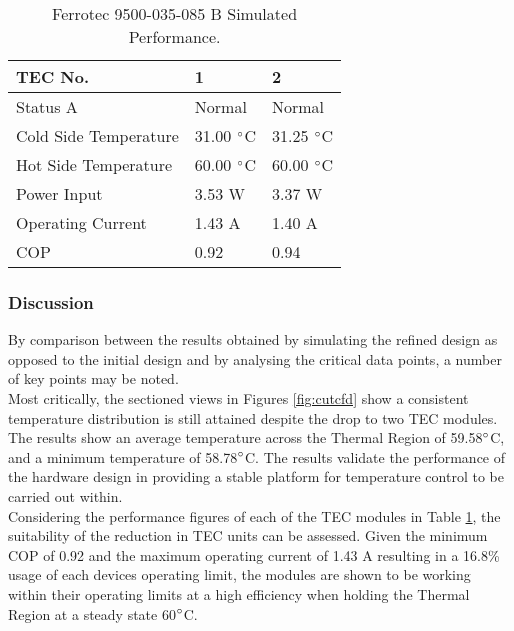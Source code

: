 \begin{table}[h!]
	\begin{center}
		\begin{tabular}{ p{5.15cm} |  p{3.15cm} | p{3.15cm} }
			\hline
			TEC No. & 1 & 2 \\ \hline
			Status A & Normal & Normal \\ \hline
			Cold Side Temperature & 31.00 $\degree$C & 31.25 $\degree$C \\ \hline
			Hot Side Temperature & 60.00 $\degree$C & 60.00 $\degree$C \\ \hline
			Power Input & 3.53 W & 3.37 W \\ \hline
			Operating Current & 1.43 A & 1.40 A \\ \hline
			COP & 0.92 & 0.94 \\ \hline
		\end{tabular}
	\end{center}
	\caption[Ferrotec 9500-035-085 B Simulated Performance.]{Ferrotec 9500-035-085 B Simulated Performance.}
	\label{tab:TECperf2}
\end{table}

\subsubsection{Discussion}

By comparison between the results obtained by simulating the refined design as opposed to the initial design and by analysing the critical data points, a number of key points may be noted.\\

Most critically, the sectioned views in Figures \ref{fig:cutcfd} show a consistent temperature distribution is still attained despite the drop to two TEC modules. The results show an average temperature across the Thermal Region of 59.58$\degree$C, and a minimum temperature of 58.78$\degree$C. The results validate the performance of the hardware design in providing a stable platform for temperature control to be carried out within.\\

Considering the performance figures of each of the TEC modules in Table \ref{tab:TECperf2}, the suitability of the reduction in TEC units can be assessed. Given the minimum COP of 0.92 and the maximum operating current of 1.43 A resulting in a 16.8\% usage of each devices operating limit, the modules are shown to be working within their operating limits at a high efficiency when holding the Thermal Region at a steady state 60$\degree$C.\\

